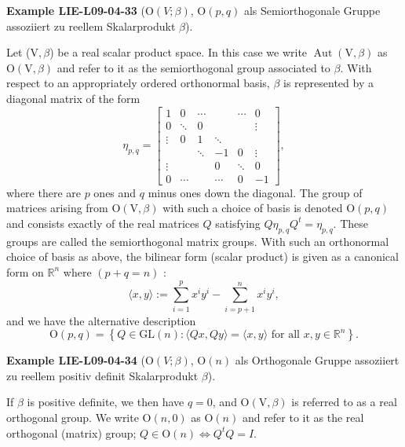 \documentclass[10pt, letterpaper]{article}
\newcommand{\Ogroup}{\mathrm{O}} %
\newcommand{\CustomHeading}[3]{%
  \par\medskip\noindent%
  \textbf{#1 #2} \textnormal{(#3)}.\enskip%
}
\newenvironment{EXA}[2]{\CustomHeading{Example}{#1}{#2}}{}
\begin{document}
\begin{EXA}{LIE-L09-04-33}{$\Ogroup(V;\beta)$, $\Ogroup(p,q)$ als Semiorthogonale Gruppe assoziiert zu reellem Skalarprodukt $\beta$}
Let ($\mathrm{V},\beta$) be a real scalar product space. In this case we write $\operatorname{Aut}(\mathrm{V}, \beta)$ as $\mathrm{O}(\mathrm{V}, \beta)$ and refer to it as the semiorthogonal group associated to $\beta$. With respect to an appropriately ordered orthonormal basis, $\beta$ is represented by a diagonal matrix of the form
$$
\eta_{p, q}=\left[\begin{array}{cccccc}
1 & 0 & \cdots & & \cdots & 0 \\
0 & \ddots & 0 & & & \vdots \\
\vdots & 0 & 1 & \ddots & & \\
& & \ddots & -1 & 0 & \vdots \\
\vdots & & & 0 & \ddots & 0 \\
0 & \cdots & & \cdots & 0 & -1
\end{array}\right],
$$
where there are $p$ ones and $q$ minus ones down the diagonal. The group of matrices arising from $\mathrm{O}(\mathrm{V}, \beta)$ with such a choice of basis is denoted $\mathrm{O}(p, q)$ and consists exactly of the real matrices $Q$ satisfying $Q \eta_{p, q} Q^{t}=\eta_{p, q}$. These groups are called the semiorthogonal matrix groups. With such an orthonormal choice of basis as above, the bilinear form (scalar product) is given as a canonical form on $\mathbb{R}^{n}$ where $(p+q=n)$ :
$$
\langle x, y\rangle:=\sum_{i=1}^{p} x^{i} y^{i}-\sum_{i=p+1}^{n} x^{i} y^{i},
$$
and we have the alternative description
$$
\mathrm{O}(p, q)=\left\{Q \in \mathrm{GL}(n):\langle Q x, Q y\rangle=\langle x, y\rangle \text { for all } x, y \in \mathbb{R}^{n}\right\} .
$$
\end{EXA}

\begin{EXA}{LIE-L09-04-34}{$\Ogroup(V;\beta)$, $\Ogroup(n)$ als Orthogonale Gruppe assoziiert zu reellem positiv definit Skalarprodukt $\beta$}
If $\beta$ is positive definite, we then have $q=0$, and $\mathrm{O}(\mathrm{V}, \beta)$ is referred to as a real orthogonal group. We write $\mathrm{O}(n, 0)$ as $\mathrm{O}(n)$ and refer to it as the real orthogonal (matrix) group; $Q \in \mathrm{O}(n) \Longleftrightarrow Q^{t} Q=I$.
\end{EXA}
\end{document}
